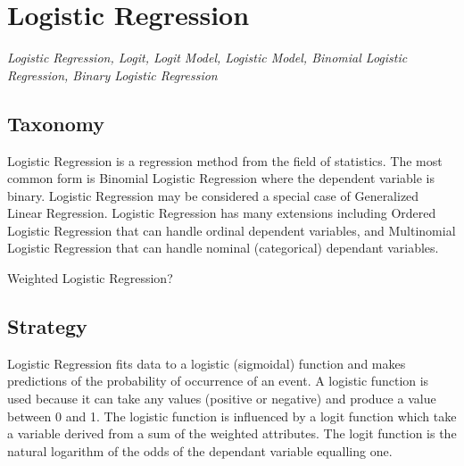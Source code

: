 
\section{Logistic Regression} 
\label{sec:logistic}

\emph{Logistic Regression, Logit, Logit Model, Logistic Model, Binomial Logistic Regression, Binary Logistic Regression}

\subsection{Taxonomy}
Logistic Regression is a regression method from the field of statistics. 
The most common form is Binomial Logistic Regression where the dependent variable is binary.
Logistic Regression may be considered a special case of Generalized Linear Regression.
Logistic Regression has many extensions including Ordered Logistic Regression that can handle ordinal dependent variables, and Multinomial Logistic Regression that can handle nominal (categorical) dependant variables.

Weighted Logistic Regression?

\subsection{Strategy}
Logistic Regression fits data to a logistic (sigmoidal) function and makes predictions of the probability of occurrence of an event. 
A logistic function is used because it can take any values (positive or negative) and produce a value between 0 and 1. The logistic function is influenced by a logit function which take a variable derived from a sum of the weighted attributes. The logit function is the natural logarithm of the odds of the dependant variable equalling one.

